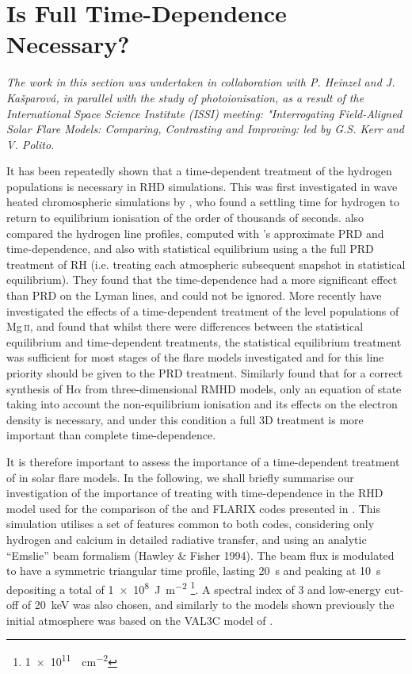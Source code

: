 \section{Is Full Time-Dependence Necessary?}\label{Sec:TimeDepSE}

\emph{The work in this section was undertaken in collaboration with P. Heinzel and J. Kašparová, in parallel with the study of \Caii{} photoionisation, as a result of the International Space Science Institute (ISSI) meeting: "Interrogating Field-Aligned Solar Flare Models: Comparing, Contrasting and Improving: led by G.S. Kerr and V. Polito.}

It has been repeatedly shown that a time-dependent treatment of the hydrogen populations is necessary in RHD simulations.
This was first investigated in wave heated chromospheric simulations by \citet{Carlsson2002}, who found a settling time for hydrogen to return to equilibrium ionisation of the order of thousands of seconds.
\citet{Brown2018} also compared the hydrogen line profiles, computed with \Radyn{}'s approximate PRD and time-dependence, and also with statistical equilibrium using a the full PRD treatment of RH (i.e. treating each atmospheric subsequent snapshot in statistical equilibrium).
They found that the time-dependence had a more significant effect than PRD on the Lyman lines, and could not be ignored.
More recently \citet{Kerr2019a} have investigated the effects of a time-dependent treatment of the level populations of Mg\,\textsc{ii}, and found that whilst there were differences between the statistical equilibrium and time-dependent treatments, the statistical equilibrium treatment was sufficient for most stages of the flare models investigated and for this line priority should be given to the PRD treatment.
Similarly \citet{Leenaarts2012a} found that for a correct synthesis of H$\alpha$ from three-dimensional RMHD models, only an equation of state taking into account the non-equilibrium ionisation and its effects on the electron density is necessary, and under this condition a full 3D treatment is more important than complete time-dependence.

It is therefore important to assess the importance of a time-dependent treatment of \Caii{} in solar flare models.
In the following, we shall briefly summarise our investigation of the importance of treating \Caii{} with time-dependence in the RHD model used for the comparison of the \Radyn{} and FLARIX codes presented in \citet{Kasparova2019}.
This simulation utilises a set of features common to both codes, considering only hydrogen and calcium in detailed radiative transfer, and using an analytic ``Emslie'' beam formalism \NeedRef{} (Hawley \& Fisher 1994).
The beam flux is modulated to have a symmetric triangular time profile, lasting \SI{20}{\second} and peaking at \SI{10}{\second} depositing a total of \SI{1e8}{\joule\per\square\metre} \footnote{\SI{1e11}{\erg\per\square\centi\metre}}.
A spectral index of 3 and low-energy cut-off of \SI{20}{\kilo\electronvolt} was also chosen, and similarly to the models shown previously the initial atmosphere was based on the VAL3C model of \citet{Vernazza1981}.

